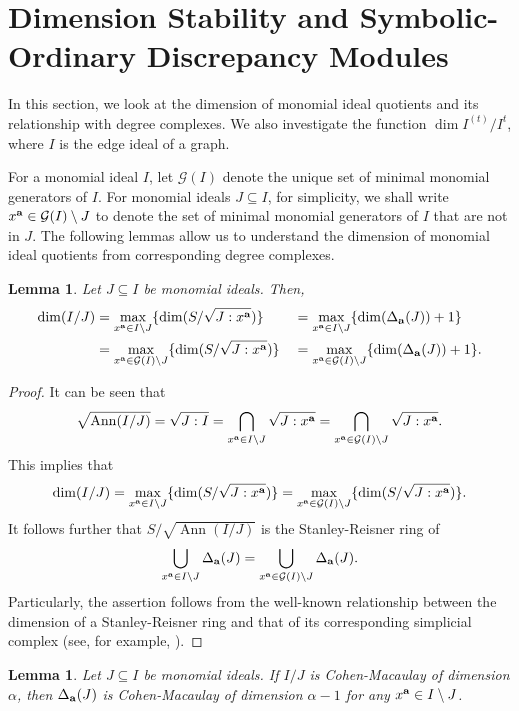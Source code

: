 \documentclass[12pt]{amsart}
\numberwithin{equation}{section}
\newtheorem{lemma}[theorem]{Lemma}
\theoremstyle{definition}
\theoremstyle{definition}
\DeclareMathOperator{\Ann}{Ann}
\def\a{{\bold a}}
\def\G{\mathcal{G}}
\begin{document}

\section{Dimension Stability and Symbolic-Ordinary Discrepancy Modules} \label{sec.dim}

In this section, we look at the dimension of monomial ideal quotients and its relationship with degree complexes. We also investigate the function $\dim I^{(t)}/I^t$, where $I$ is the edge ideal of a graph.

For a monomial ideal $I$, let $\G(I)$ denote the unique set of minimal monomial generators of $I$. For monomial ideals $J \subseteq I$, for simplicity, we shall write $x^\a \in \G(I) \setminus J$ to denote the set of minimal monomial generators of $I$ that are not in $J$. The following lemmas allow us to understand the dimension of monomial ideal quotients from corresponding degree complexes. 

\begin{lemma} \label{Lemma1} Let $J\subseteq I$ be monomial ideals. Then, 
\begin{alignat*}{2}
	\dim(I/J) & = \max\limits_{x^\a \in I \setminus J}\{\dim (S/\sqrt{J: x^\a})\} && = \max\limits_{x^\a \in I \setminus J}\{\dim(\Delta_\a(J))+1\} \\
	&= \max\limits_{x^\a \in \G(I) \setminus J}\{\dim (S/\sqrt{J: x^\a})\} && = 
	\max\limits_{x^\a \in \G(I) \setminus J}\{\dim(\Delta_\a(J))+1\}.
\end{alignat*}
\end{lemma}

\begin{proof} It can be seen that 
	$$\sqrt{\Ann(I/J)}=\sqrt{J:I}=\bigcap\limits_{x^\a \in I \setminus J} \sqrt{J:x^\a} = \bigcap\limits_{x^\a \in \G(I) \setminus J} \sqrt{J:x^\a}.$$
This implies that
$$\dim(I/J) = \max\limits_{x^\a \in I \setminus J}\{\dim (S/\sqrt{J: x^\a})\} = \max\limits_{x^\a \in \G(I) \setminus J}\{\dim (S/\sqrt{J: x^\a})\}.$$
It follows further that
	$S/\sqrt{\Ann(I/J)}$ is the Stanley-Reisner ring of 
	$$\bigcup_{x^\a\in I\setminus J} \Delta_\a(J)=\bigcup_{x^\a\in \G(I)\setminus J} \Delta_\a(J).$$
	Particularly, the assertion follows from the well-known relationship between the dimension of a Stanley-Reisner ring and that of its corresponding simplicial complex (see, for example, \cite{Stanley}).
\end{proof}

\begin{lemma} \label{Lemma2} Let $J \subseteq I$ be monomial ideals. If $I/J$ is Cohen-Macaulay of dimension $\alpha$, then $\Delta_\a(J)$ is Cohen-Macaulay of dimension $\alpha-1$ for any $x^\a\in I\setminus J$.
\end{lemma}
\end{document}
